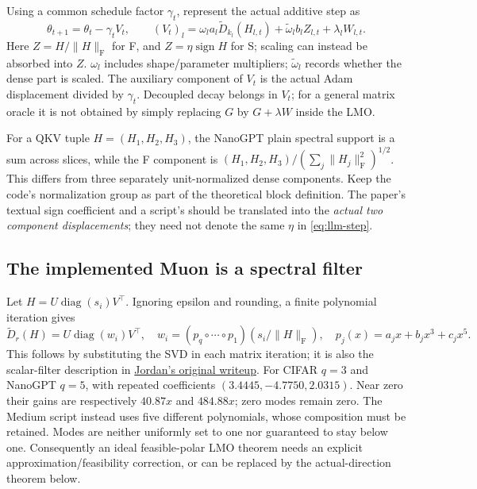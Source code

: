 \documentclass[11pt]{article}
\newcommand{\F}[1]{\lVert #1\rVert_{\mathrm F}}
\newcommand{\sgn}{\operatorname{sign}}
\begin{document}
Using a common schedule factor $\gamma_t$, represent the actual additive
step as
\begin{equation}\label{eq:llm-step}
 \theta_{t+1}=\theta_t-\gamma_t V_t,\qquad
 (V_t)_l=\omega_l a_l\widetilde D_{k_l}(H_{l,t})
                +\widetilde\omega_l b_l Z_{l,t}+\lambda_lW_{l,t}.
\end{equation}
Here $Z=H/\F{H}$ for F, and $Z=\eta\sgn H$ for S; scaling can instead
be absorbed into $Z$. $\omega_l$ includes shape/parameter multipliers;
$\widetilde\omega_l$ records whether the dense part is scaled. The
auxiliary component of $V_t$ is the actual Adam displacement divided by
$\gamma_t$. Decoupled decay belongs in $V_t$; for a general matrix oracle
it is not obtained by simply replacing $G$ by $G+\lambda W$ inside the LMO.

For a QKV tuple $H=(H_1,H_2,H_3)$, the NanoGPT plain spectral support is a
sum across slices, while the F component is
$(H_1,H_2,H_3)/(\sum_j\F{H_j}^2)^{1/2}$. This differs from three separately
unit-normalized dense components. Keep the code's normalization group as
part of the theoretical block definition. The paper's textual sign
coefficient and a script's  should be translated into
the \emph{actual two component displacements}; they need not denote the
same $\eta$ in \eqref{eq:llm-step}.

\subsection{The implemented Muon is a spectral filter}

Let $H=U\operatorname{diag}(s_i)V^\top$. Ignoring epsilon and rounding, a
finite polynomial iteration gives
\begin{equation}\label{eq:filter}
 \widetilde D_r(H)=U\operatorname{diag}(w_i)V^\top,\quad
 w_i=(p_q\circ\cdots\circ p_1)(s_i/\F{H}),\quad
 p_j(x)=a_jx+b_jx^3+c_jx^5.
\end{equation}
This follows by substituting the SVD in each matrix iteration; it is also
the scalar-filter description in
\href{https://kellerjordan.github.io/posts/muon/}{Jordan's original writeup}.
For CIFAR $q=3$ and NanoGPT $q=5$, with repeated coefficients
$(3.4445,-4.7750,2.0315)$. Near zero their gains are respectively
$40.87x$ and $484.88x$; zero modes remain zero. The Medium script instead
uses five different polynomials, whose composition must be retained.
Modes are neither uniformly set to one nor guaranteed to stay below one.
Consequently an ideal feasible-polar LMO theorem needs an explicit
approximation/feasibility correction, or can be replaced by the
actual-direction theorem below.
\end{document}

